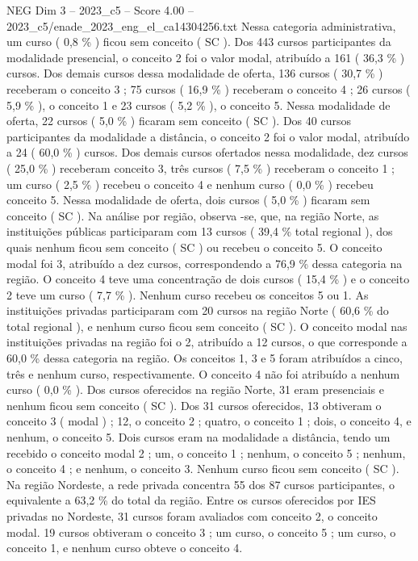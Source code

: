 \begin{textsample}{NEG Dim 3 – 2023\_c5 – Score 4.00 – 2023\_c5/enade\_2023\_eng\_el\_ca14304256.txt}
Nessa categoria administrativa, um curso ( 0,8 \% ) ficou sem conceito ( SC ).
Dos 443 cursos participantes da modalidade presencial, o conceito 2 foi o valor modal, atribuído a 161 ( 36,3 \% ) cursos.
Dos demais cursos dessa modalidade de oferta, 136 cursos ( 30,7 \% ) receberam o conceito 3 ; 75 cursos ( 16,9 \% ) receberam o conceito 4 ; 26 cursos ( 5,9 \% ), o conceito 1 e 23 cursos ( 5,2 \% ), o conceito 5.
Nessa modalidade de oferta, 22 cursos ( 5,0 \% ) ficaram sem conceito ( SC ).
Dos 40 cursos participantes da modalidade a distância, o conceito 2 foi o valor modal, atribuído a 24 ( 60,0 \% ) cursos.
Dos demais cursos ofertados nessa modalidade, dez cursos ( 25,0 \% ) receberam conceito 3, três cursos ( 7,5 \% ) receberam o conceito 1 ; um curso ( 2,5 \% ) recebeu o conceito 4 e nenhum curso ( 0,0 \% ) recebeu conceito 5.
Nessa modalidade de oferta, dois cursos ( 5,0 \% ) ficaram sem conceito ( SC ).
Na análise por região, observa -se, que, na região Norte, as instituições públicas participaram com 13 cursos ( 39,4 \% total regional ), dos quais nenhum ficou sem conceito ( SC ) ou recebeu o conceito 5.
O conceito modal foi 3, atribuído a dez cursos, correspondendo a 76,9 \% dessa categoria na região.
O conceito 4 teve uma concentração de dois cursos ( 15,4 \% ) e o conceito 2 teve um curso ( 7,7 \% ).
Nenhum curso recebeu os conceitos 5 ou 1.
As instituições privadas participaram com 20 cursos na região Norte ( 60,6 \% do total regional ), e nenhum curso ficou sem conceito ( SC ).
O conceito modal nas instituições privadas na região foi o 2, atribuído a 12 cursos, o que corresponde a 60,0 \% dessa categoria na região.
Os conceitos 1, 3 e 5 foram atribuídos a cinco, três e nenhum curso, respectivamente.
O conceito 4 não foi atribuído a nenhum curso ( 0,0 \% ).
Dos cursos oferecidos na região Norte, 31 eram presenciais e nenhum ficou sem conceito ( SC ).
Dos 31 cursos oferecidos, 13 obtiveram o conceito 3 ( modal ) ; 12, o conceito 2 ; quatro, o conceito 1 ; dois, o conceito 4, e nenhum, o conceito 5.
Dois cursos eram na modalidade a distância, tendo um recebido o conceito modal 2 ; um, o conceito 1 ; nenhum, o conceito 5 ; nenhum, o conceito 4 ; e nenhum, o conceito 3.
Nenhum curso ficou sem conceito ( SC ).
Na região Nordeste, a rede privada concentra 55 dos 87 cursos participantes, o equivalente a 63,2 \% do total da região.
Entre os cursos oferecidos por IES privadas no Nordeste, 31 cursos foram avaliados com conceito 2, o conceito modal. 19 cursos obtiveram o conceito 3 ; um curso, o conceito 5 ; um curso, o conceito 1, e nenhum curso obteve o conceito 4.

\end{textsample}
